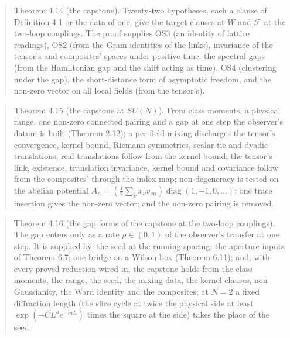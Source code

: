 \documentclass[10pt,letterpaper,twocolumn]{article}
\begin{document}
\begin{quote}
Theorem 4.14 (the capstone). Twenty-two hypotheses, each a clause of Definition 4.1 or the data of one, give the target clauses at \(W\) and \(\mathcal F\) at the two-loop couplings. The proof supplies OS3 (an identity of lattice readings), OS2 (from the Gram identities of the links), invariance of the tensor's and composites' spaces under positive time, the spectral gaps (from the Hamiltonian gap and the shift acting as time), OS4 (clustering under the gap), the short-distance form of asymptotic freedom, and the non-zero vector on all local fields (from the tensor's).
\end{quote}

\begin{quote}
Theorem 4.15 (the capstone at \(SU(N)\)). From class moments, a physical range, one non-zero connected pairing and a gap at one step the observer's datum is built (Theorem 2.12); a per-field mixing discharges the tensor's convergence, kernel bound, Riemann symmetries, scalar tie and dyadic translations; real translations follow from the kernel bound; the tensor's link, existence, translation invariance, kernel bound and covariance follow from the composites' through the index map; non-degeneracy is tested on the abelian potential \(A_\mu=(\tfrac12\sum_\nu x_\nu v_{\nu\mu})\operatorname{diag}(1,-1,0,\dots)\); one trace insertion gives the non-zero vector; and the non-zero pairing is removed.
\end{quote}

\begin{quote}
Theorem 4.16 (the gap forms of the capstone at the two-loop couplings). The gap enters only as a rate \(\rho\in(0,1)\) of the observer's transfer at one step. It is supplied by: the seed at the running spacing; the aperture inputs of Theorem 6.7; one bridge on a Wilson box (Theorem 6.11); and, with every proved reduction wired in, the capstone holds from the class moments, the range, the seed, the mixing data, the kernel clauses, non-Gaussianity, the Ward identity and the composites; at \(N=2\) a fixed diffraction length (the slice cycle at twice the physical side at least \(\exp(-CL^de^{-mL})\) times the square at the side) takes the place of the seed.
\end{quote}
\end{document}
